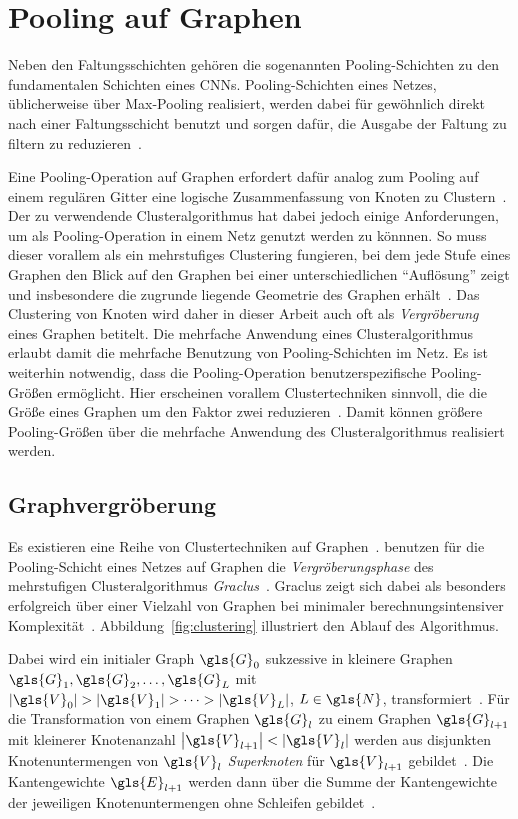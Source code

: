 \section{Pooling auf Graphen}
\label{pooling}

Neben den Faltungsschichten gehören die sogenannten Pooling-Schichten zu den fundamentalen Schichten eines \glspl{CNN}.
Pooling-Schichten eines Netzes, üblicherweise über Max-Pooling realisiert, werden dabei für gewöhnlich direkt nach einer Faltungsschicht benutzt und sorgen dafür, die Ausgabe der Faltung zu filtern \bzw{} zu reduzieren~\cite{Nielsen}.

Eine Pooling-Operation auf Graphen erfordert dafür analog zum Pooling auf einem regulären Gitter eine logische Zusammenfassung von Knoten zu Clustern~\cite{Defferrard}.
Der zu verwendende Clusteralgorithmus hat dabei jedoch einige Anforderungen, um als Pooling-Operation in einem Netz genutzt werden zu könnnen.
So muss dieser vorallem als ein mehrstufiges Clustering fungieren, bei dem jede Stufe eines Graphen den Blick auf den Graphen bei einer unterschiedlichen \enquote{Auflösung} zeigt und insbesondere die zugrunde liegende Geometrie des Graphen erhält~\cite{Defferrard}.
Das Clustering von Knoten wird daher in dieser Arbeit auch oft als \emph{Vergröberung} eines Graphen betitelt.
Die mehrfache Anwendung eines Clusteralgorithmus erlaubt damit die mehrfache Benutzung von Pooling-Schichten im Netz.
Es ist weiterhin notwendig, dass die Pooling-Operation benutzerspezifische Pooling-Größen ermöglicht.
Hier erscheinen vorallem Clustertechniken sinnvoll, die die Größe eines Graphen um den Faktor zwei reduzieren~\cite{Defferrard}.
Damit können größere Pooling-Größen über die mehrfache Anwendung des Clusteralgorithmus realisiert werden.

\subsection{Graphvergröberung}
\label{graphvergroeberung}

Es existieren eine Reihe von Clustertechniken auf Graphen~\cite{Luxburg, graclus, Defferrard}.
\citeauthor{Defferrard} benutzen für die Pooling-Schicht eines Netzes auf Graphen die \emph{Vergröberungsphase} des mehrstufigen Clusteralgorithmus \emph{Graclus}~\cite{graclus}.
Graclus zeigt sich dabei als besonders erfolgreich über einer Vielzahl von Graphen bei minimaler berechnungsintensiver Komplexität~\cite{Defferrard}.
Abbildung~\ref{fig:clustering} illustriert den Ablauf des Algorithmus.

Dabei wird ein initialer Graph $\gls{G}_0$ sukzessive in kleinere Graphen $\gls{G}_1, \gls{G}_2, \ldots, \gls{G}_L$ mit $\left|\gls{V}_0\right| > \left|\gls{V}_1\right| > \cdots > |\gls{V}_L|$, $L \in \gls{N}$, transformiert~\cite{graclus}.
Für die Transformation von einem Graphen $\gls{G}_l$ zu einem Graphen $\gls{G}_{l+1}$ mit kleinerer Knotenanzahl $\left|\gls{V}_{l+1}\right| < \left|\gls{V}_l\right|$ werden aus disjunkten Knotenuntermengen von $\gls{V}_l$ \emph{Superknoten} für $\gls{V}_{l+1}$ gebildet~\cite{graclus}.
Die Kantengewichte $\gls{E}_{l+1}$ werden dann über die Summe der Kantengewichte der jeweiligen Knotenuntermengen ohne Schleifen gebildet~\cite{graclus}.

